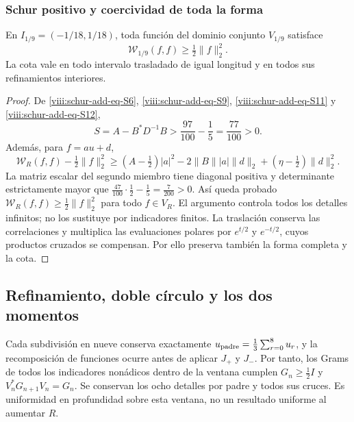 \subsubsection{Schur positivo y coercividad de toda la forma}
\label{viii:schur-add-sub-348}

\begin{theorem}
\label{viii:schur-add:coercividad-ventana}
En \(I_{1/9}=(-1/18,1/18)\), toda función del dominio conjunto
\(V_{1/9}\) satisface
\[
\mathscr W_{1/9}(f,f)\geq\tfrac12\|f\|_2^2.
\]
La cota vale en todo intervalo trasladado de igual longitud y en todos
sus refinamientos interiores.
\end{theorem}
\begin{proof}
De \eqref{viii:schur-add-eq-S6}, \eqref{viii:schur-add-eq-S9},
\eqref{viii:schur-add-eq-S11} y \eqref{viii:schur-add-eq-S12},
\begin{equation}
S=A-B^*D^{-1}B>\frac{97}{100}-\frac15=\frac{77}{100}>0.
\label{viii:schur-add-display-29}
\end{equation}
Además, para \(f=au+d\),
\begin{equation}
\mathscr W_R(f,f)-\tfrac12\|f\|_2^2
\geq(A-\tfrac12)|a|^2
-2\|B\||a|\|d\|_2+(\eta-\tfrac12)\|d\|_2^2.
\label{viii:schur-add-display-30}
\end{equation}
La matriz escalar del segundo miembro tiene diagonal positiva y
determinante estrictamente mayor que
\(\tfrac{47}{100}\cdot\tfrac12-\tfrac15=\tfrac7{200}>0\).
Así queda probado \(\mathscr W_R(f,f)\geq\tfrac12\|f\|_2^2\)
para todo \(f\in V_R\). El argumento controla todos los detalles
infinitos; no los sustituye por indicadores finitos. La traslación
conserva las correlaciones y multiplica las evaluaciones polares
por \(e^{t/2}\) y \(e^{-t/2}\), cuyos productos cruzados se compensan.
Por ello preserva también la forma completa y la cota.
\end{proof}

\subsection{Refinamiento, doble círculo y los dos momentos}
\label{viii:schur-add-sub-367}

Cada subdivisión en nueve conserva exactamente
\(u_{\rm padre}=\tfrac13\sum_{r=0}^8u_r\), y la recomposición de
funciones ocurre antes de aplicar \(J_+\) y \(J_-\). Por tanto,
los Grams de todos los indicadores nonádicos dentro de la ventana
cumplen \(G_n\geq\tfrac12 I\) y
\(V_n^*G_{n+1}V_n=G_n\). Se conservan los ocho detalles por padre y
todos sus cruces. Es uniformidad en profundidad sobre esta ventana,
no un resultado uniforme al aumentar \(R\).

